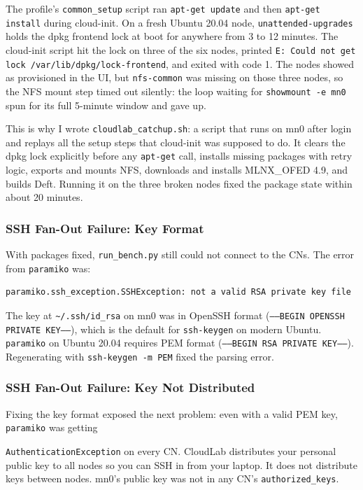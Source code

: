 \documentclass[10pt]{article}
\begin{document}
The profile's \texttt{common\_setup} script ran \texttt{apt-get update} and then
\texttt{apt-get install} during cloud-init.
On a fresh Ubuntu 20.04 node, \texttt{unattended-upgrades} holds the dpkg frontend
lock at boot for anywhere from 3 to 12 minutes.
The cloud-init script hit the lock on three of the six nodes, printed
\texttt{E: Could not get lock /var/lib/dpkg/lock-frontend}, and exited with code 1.
The nodes showed as provisioned in the UI, but \texttt{nfs-common} was missing on
those three nodes, so the NFS mount step timed out silently: the loop waiting
for \texttt{showmount -e mn0} spun for its full 5-minute window and gave up.

This is why I wrote \texttt{cloudlab\_catchup.sh}: a script that runs on mn0
after login and replays all the setup steps that cloud-init was supposed to do.
It clears the dpkg lock explicitly before any \texttt{apt-get} call, installs
missing packages with retry logic, exports and mounts NFS, downloads and installs
MLNX\_OFED 4.9, and builds Deft.
Running it on the three broken nodes fixed the package state within about 20 minutes.

\subsubsection{SSH Fan-Out Failure: Key Format}

With packages fixed, \texttt{run\_bench.py} still could not connect to the CNs.
The error from \texttt{paramiko} was:
\begin{lstlisting}
paramiko.ssh_exception.SSHException: not a valid RSA private key file
\end{lstlisting}
The key at \texttt{\textasciitilde/.ssh/id\_rsa} on mn0 was in OpenSSH format
(\texttt{-----BEGIN OPENSSH PRIVATE KEY-----}), which is the default for
\texttt{ssh-keygen} on modern Ubuntu.
\texttt{paramiko} on Ubuntu 20.04 requires PEM format
(\texttt{-----BEGIN RSA PRIVATE KEY-----}).
Regenerating with \texttt{ssh-keygen -m PEM} fixed the parsing error.

\subsubsection{SSH Fan-Out Failure: Key Not Distributed}

Fixing the key format exposed the next problem: even with a valid PEM key,
\texttt{paramiko} was getting

\texttt{AuthenticationException} on every CN.
CloudLab distributes your personal public key to all nodes so you can SSH in
from your laptop.
It does not distribute keys between nodes.
mn0's public key was not in any CN's \texttt{authorized\_keys}.
\end{document}
